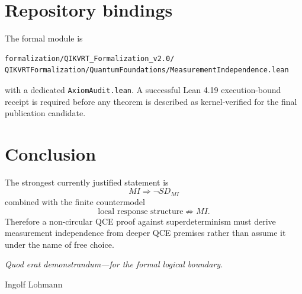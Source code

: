 \documentclass[11pt,a4paper]{article}
\begin{document}
\section{Repository bindings}
The formal module is
\begin{verbatim}
formalization/QIKVRT_Formalization_v2.0/
QIKVRTFormalization/QuantumFoundations/MeasurementIndependence.lean
\end{verbatim}
with a dedicated \texttt{AxiomAudit.lean}.  A successful Lean 4.19 execution-bound receipt is required before any theorem is described as kernel-verified for the final publication candidate.

\section{Conclusion}
The strongest currently justified statement is
\[
\boxed{MI\Rightarrow\neg SD_{MI}}
\]
combined with the finite countermodel
\[
\boxed{\text{local response structure}\not\Rightarrow MI}.
\]
Therefore a non-circular QCE proof against superdeterminism must derive measurement independence from deeper QCE premises rather than assume it under the name of free choice.

\bigskip
\noindent\textit{Quod erat demonstrandum---for the formal logical boundary.}

\noindent Ingolf Lohmann
\end{document}
